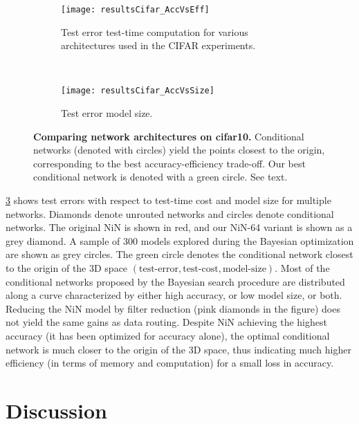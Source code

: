 \documentclass[thesis]{subfiles}
\begin{document}
	
	\begin{figure}[tbp] 
		\centering
		\begin{subfigure}[b]{0.95\linewidth}
			\centering
			\texttt{[image: resultsCifar\_AccVsEff]}
			\caption{Test error \vs test-time computation for various architectures used in the CIFAR experiments.}\label{fig:resultsCifar_AccVsEff}
		\end{subfigure}
		~
		\begin{subfigure}[b]{0.95\linewidth}
			\centering
			\texttt{[image: resultsCifar\_AccVsSize]}
			\caption{Test error \vs model size.}\label{fig:resultsCifar_AccVsSize}
		\end{subfigure}
		\caption[Comparing network architectures on \gls{cifar10}]{\textbf{Comparing network architectures on \gls{cifar10}.} Conditional networks (denoted with circles) yield the points closest to the origin, corresponding to the best accuracy-efficiency trade-off. Our best conditional network is denoted with a green circle. See text.}\label{fig:Cifar_results}
	\end{figure}
	\cref{fig:Cifar_results} shows test errors with respect to test-time cost and model size for multiple networks.
	Diamonds denote unrouted networks and circles denote conditional networks. 
	The original NiN is shown in red, and our NiN-64 variant is shown as a grey diamond.
	A sample of 300 models explored during the Bayesian optimization are shown as grey circles.
	The green circle denotes the conditional network closest to the origin of the 
	3D space $(\textrm{test-error}, \textrm{test-cost}, \textrm{model-size})$.
	Most of the conditional networks proposed by the Bayesian search procedure are distributed along a curve characterized by either high accuracy, or low model size, or both. 
	Reducing the NiN model by filter reduction (pink diamonds in the figure) does not yield the same gains as data routing.
	Despite NiN achieving the highest accuracy (it has been optimized for accuracy alone), the optimal conditional network is much closer to the origin of the 3D space, thus indicating much higher efficiency (in terms of memory and computation) for a small loss in accuracy.
	
	\section{Discussion}

\end{document}
